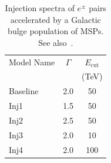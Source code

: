 \documentclass[doublespace,nopageskip]{VTthesis} %
\begin{document}
\begin{table}
  \centering
    \begin{tabular}{lcc}\hline\hline
    Model Name&$\Gamma$ & $E_{\text{cut}}$\\
    & &  (TeV) \\\hline
    Baseline &2.0 & 50 \\
    Inj1&1.5 & 50 \\
    Inj2&2.5 & 50 \\
    Inj3&2.0 & 10 \\
    Inj4&2.0 & 100\\\hline\hline
    \end{tabular}
    \caption{Injection spectra of $e^{\pm}$ pairs accelerated by a Galactic bulge population of MSPs. See also~\citep{Song:2019nrx}.}
    \label{tab:mspspectrum}
\end{table}
\end{document}
